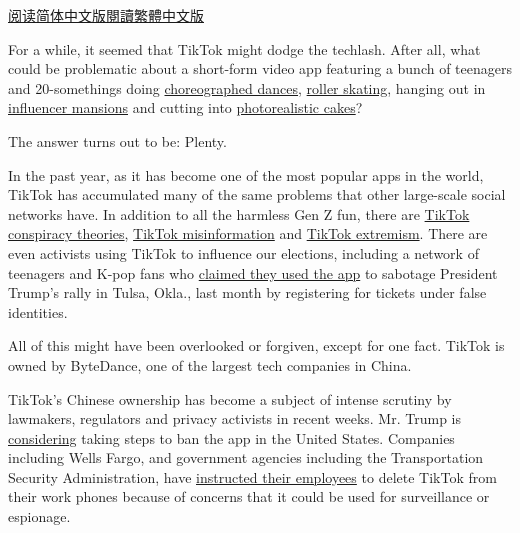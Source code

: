 \href{https://cn.nytimes.com/technology/20200728/tiktok-china-ban-model/}{阅读简体中文版}\href{https://cn.nytimes.com/technology/20200728/tiktok-china-ban-model/zh-hant/}{閱讀繁體中文版}

For a while, it seemed that TikTok might dodge the techlash. After all,
what could be problematic about a short-form video app featuring a bunch
of teenagers and 20-somethings doing
\href{https://www.nytimes.com/2020/02/13/style/the-original-renegade.html}{choreographed
dances},
\href{https://www.buzzfeednews.com/article/laurenstrapagiel/roller-skating-is-back-tiktok-ana-coto}{roller
skating}, hanging out in
\href{https://www.nytimes.com/2020/01/03/style/hype-house-los-angeles-tik-tok.html}{influencer
mansions} and cutting into
\href{https://www.nytimes.com/2020/07/14/style/what-is-the-cake-meme.html}{photorealistic
cakes}?

The answer turns out to be: Plenty.

In the past year, as it has become one of the most popular apps in the
world, TikTok has accumulated many of the same problems that other
large-scale social networks have. In addition to all the harmless Gen Z
fun, there are
\href{https://www.nytimes.com/2020/06/29/technology/pizzagate-tiktok.html}{TikTok
conspiracy theories},
\href{https://www.rollingstone.com/culture/culture-features/tiktok-conspiracy-theories-bill-gates-microchip-vaccine-996394/}{TikTok
misinformation} and
\href{https://www.bbc.com/news/technology-53269361}{TikTok extremism}.
There are even activists using TikTok to influence our elections,
including a network of teenagers and K-pop fans who
\href{https://www.nytimes.com/2020/06/21/style/tiktok-trump-rally-tulsa.html}{claimed
they used the app} to sabotage President Trump's rally in Tulsa, Okla.,
last month by registering for tickets under false identities.

All of this might have been overlooked or forgiven, except for one fact.
TikTok is owned by ByteDance, one of the largest tech companies in
China.

TikTok's Chinese ownership has become a subject of intense scrutiny by
lawmakers, regulators and privacy activists in recent weeks. Mr. Trump
is
\href{https://www.nytimes.com/reuters/2020/07/20/technology/20reuters-usa-election-trump-tiktok.html}{considering}
taking steps to ban the app in the United States. Companies including
Wells Fargo, and government agencies including the Transportation
Security Administration, have
\href{https://www.theverge.com/2020/7/11/21320935/wells-fargo-bans-tiktok-devices-amazon-pompeo}{instructed
their employees} to delete TikTok from their work phones because of
concerns that it could be used for surveillance or espionage.

